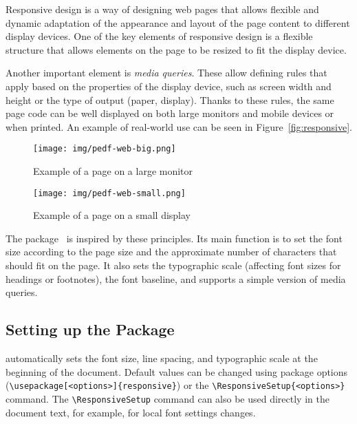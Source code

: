 \documentclass{ltugboat}
\begin{document}
Responsive design is a way of designing web pages that allows flexible and
dynamic adaptation of the appearance and layout of the page content to
different display devices. One of the key elements of responsive design is a
flexible structure that allows elements on the page to be resized to fit the
display device.

Another important element is \textit{media queries}. These allow defining rules
that apply based on the properties of the display device, such as screen width
and height or the type of output (paper, display). Thanks to these rules, the
same page code can be well displayed on both large monitors and mobile devices
or when printed. An example of real-world use can be seen in
Figure~\ref{fig:responsive}.

\begin{figure*}[tbp]
\begin{subfigure}[t]{0.74\textwidth}
    \texttt{[image: img/pedf-web-big.png]}
    \caption{Example of a page on a large monitor}
\end{subfigure}
\hfill
\begin{subfigure}[t]{0.24\textwidth}
    \texttt{[image: img/pedf-web-small.png]}
    \caption{Example of a page on a small display}
\end{subfigure}
  \caption{Example of displaying a web page using responsive design}\label{fig:responsive}
\end{figure*}

The  package~\cite{responsive} is inspired by these
principles. Its main function is to set the font size according to the page
size and the approximate number of characters that should fit on the page. It
also sets the typographic scale (affecting font sizes for headings or
footnotes), the font baseline, and supports a simple version of media queries.

\subsection{Setting up the  Package}

 automatically sets the font size, line spacing, and
typographic scale at the beginning of the document. Default values can be
changed using package options (\verb|\usepackage[<options>]{responsive}|) or
the \verb|\ResponsiveSetup{<options>}| command. The \verb|\ResponsiveSetup|
command can also be used directly in the document text, for example, for local
font settings changes.
\end{document}
